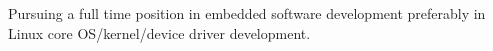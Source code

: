

\begin{cvparagraph}

Pursuing a full time position in embedded software development preferably in Linux core OS/kernel/device driver
development.
\end{cvparagraph}
